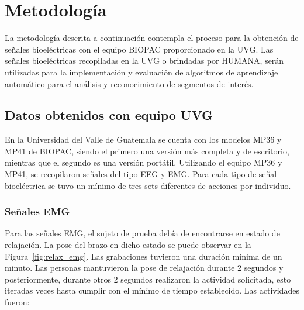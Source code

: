 \chapter{Metodología}
La metodología descrita a continuación contempla el proceso para la obtención de señales bioeléctricas con el equipo BIOPAC proporcionado en la UVG. 
Las señales bioeléctricas recopiladas en la UVG o brindadas por HUMANA, serán utilizadas para la implementación y evaluación de algoritmos de aprendizaje automático para el análisis y reconocimiento de segmentos de interés.



\section{Datos obtenidos con equipo UVG}
En la Universidad del Valle de Guatemala se cuenta con los modelos MP36 y MP41 de BIOPAC, siendo el primero una versión más completa y de escritorio, mientras que el segundo es una versión portátil. Utilizando el equipo MP36 y MP41, se recopilaron señales del tipo EEG y EMG. Para cada tipo de señal bioeléctrica se tuvo un mínimo de tres sets diferentes de acciones por individuo.

\subsection{Señales EMG}
Para las señales EMG, el sujeto de prueba debía de encontrarse en estado de relajación. La pose del brazo en dicho estado se puede observar en la Figura~\ref{fig:relax_emg}.
Las grabaciones tuvieron una duración mínima de un minuto. Las personas mantuvieron la pose de relajación durante 2 segundos y posteriormente, durante otros 2 segundos realizaron la actividad solicitada, esto iteradas veces hasta cumplir con el mínimo de tiempo establecido. Las actividades fueron:

